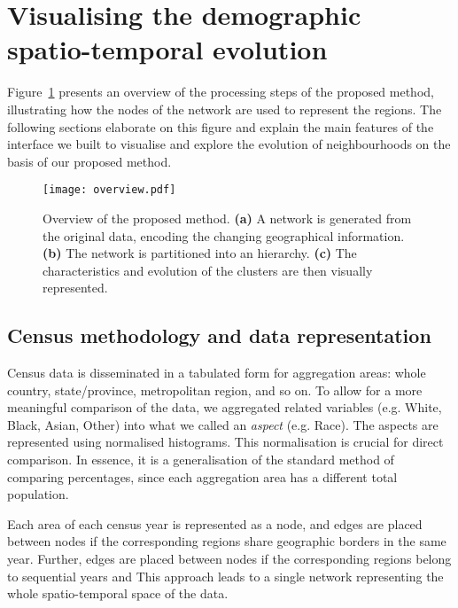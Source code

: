 \section{Visualising the demographic spatio-temporal evolution}
\label{sec:method}
Figure~\ref{fig:overview} presents an overview of the processing steps of the
proposed method, illustrating how the nodes of the network are used to represent
the regions. The following sections elaborate on this figure and explain the
main features of the interface we built to visualise and explore the evolution
of neighbourhoods on the basis of our proposed method.


\begin{figure}
    \centering 
    \texttt{[image: overview.pdf]}
    \caption{Overview of the proposed method. 
        \textbf{(a)} A network is generated from the original data,
        encoding the changing geographical information. 
        \textbf{(b)} The network is partitioned into an hierarchy. 
        \textbf{(c)} The characteristics and evolution of the clusters are then
        visually represented.
        \label{fig:overview}}
\end{figure}


\subsection{Census methodology and data representation}

Census data is disseminated in a tabulated form for aggregation areas: whole
country, state/province, metropolitan region, and so on. To allow for a more
meaningful comparison of the data, we aggregated related variables (e.g. White,
Black, Asian, Other) into what we called an \emph{aspect} (e.g. Race). The
aspects are represented using normalised histograms. This normalisation is
crucial for direct comparison. In essence, it is a generalisation of the
standard method of comparing percentages, since each aggregation area has a
different total population.

Each area of each census year is represented as a node, and edges are placed
between nodes if the corresponding regions share geographic borders in the same
year. Further, edges are placed between nodes if the corresponding regions
belong to sequential years and  This approach leads to a single network representing the whole
spatio-temporal space of the data. 


